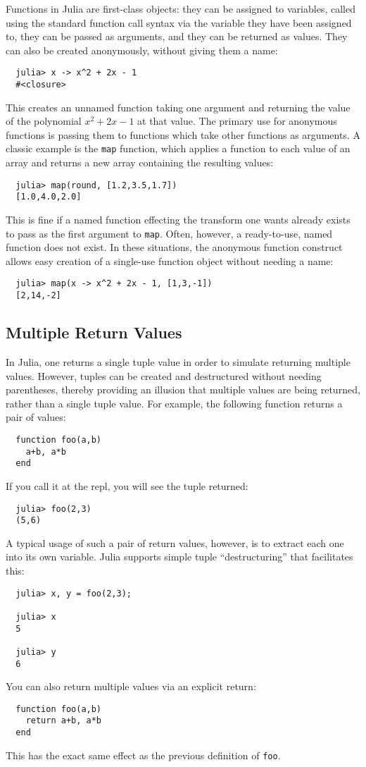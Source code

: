 \documentclass{article}
\begin{document}
Functions in Julia are first-class objects:
they can be assigned to variables, called using the standard function call syntax via the variable they have been assigned to, they can be passed as arguments, and they can be returned as values.
They can also be created anonymously, without giving them a name:
\begin{verbatim}
  julia> x -> x^2 + 2x - 1
  #<closure>
\end{verbatim}
This creates an unnamed function taking one argument and returning the value of the polynomial $x^2 + 2x - 1$ at that value.
The primary use for anonymous functions is passing them to functions which take other functions as arguments.
A classic example is the \verb|map| function, which applies a function to each value of an array and returns a new array containing the resulting values:
\begin{verbatim}
  julia> map(round, [1.2,3.5,1.7])
  [1.0,4.0,2.0]
\end{verbatim} %
This is fine if a named function effecting the transform one wants already exists to pass as the first argument to \verb|map|.
Often, however, a ready-to-use, named function does not exist.
In these situations, the anonymous function construct allows easy creation of a single-use function object without needing a name:
\begin{verbatim}
  julia> map(x -> x^2 + 2x - 1, [1,3,-1])
  [2,14,-2]
\end{verbatim}

\subsection{Multiple Return Values}

In Julia, one returns a single tuple value in order to simulate returning multiple values.
However, tuples can be created and destructured without needing parentheses, thereby providing an illusion that multiple values are being returned, rather than a single tuple value.
For example, the following function returns a pair of values:
\begin{verbatim}
  function foo(a,b)
    a+b, a*b
  end
\end{verbatim}
If you call it at the repl, you will see the tuple returned:
\begin{verbatim}
  julia> foo(2,3)
  (5,6)
\end{verbatim}
A typical usage of such a pair of return values, however, is to extract each one into its own variable.
Julia supports simple tuple ``destructuring'' that facilitates this:
\begin{verbatim}
  julia> x, y = foo(2,3);

  julia> x
  5

  julia> y
  6
\end{verbatim}
You can also return multiple values via an explicit return:
\begin{verbatim}
  function foo(a,b)
    return a+b, a*b
  end
\end{verbatim}
This has the exact same effect as the previous definition of \verb|foo|.
\end{document}
